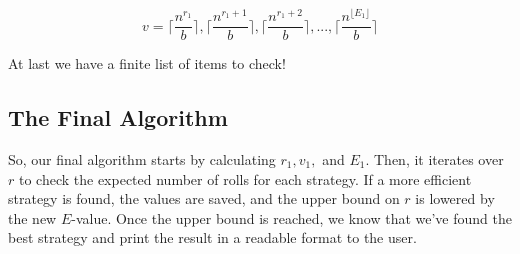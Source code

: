 \documentclass{article}
\begin{document}
$$v=\lceil \frac{n^{r_1}}{b} \rceil,\lceil \frac{n^{r_1+1}}{b} \rceil, \lceil \frac{n^{r_1+2}}{b} \rceil, ... , \lceil \frac{n^{\lfloor E_1 \rfloor}}{b} \rceil $$

At last we have a finite list of items to check!

\subsection{The Final Algorithm}
So, our final algorithm starts by calculating $r_1, v_1,$ and $E_1$. Then, it iterates over $r$ to check the expected number of rolls for each strategy. If a more efficient strategy is found, the values are saved, and the upper bound on $r$ is lowered by the new $E$-value. Once the upper bound is reached, we know that we've found the best strategy and print the result in a readable format to the user. 
\end{document}
